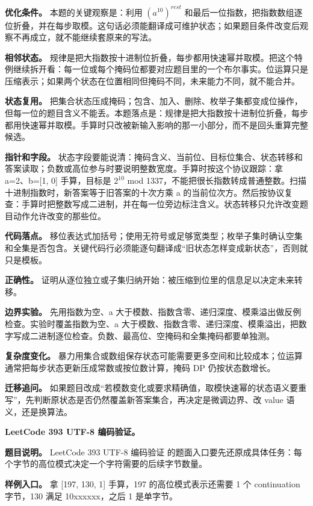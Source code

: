 \textbf{优化条件。} 本题的关键观察是：利用 \ensuremath{(a^10)^{rest}} 和最后一位指数，把指数数组逐位折叠，并在每步取模。这句话必须能翻译成可维护状态；如果题目条件改变后观察不再成立，就不能继续套原来的写法。

\textbf{相邻状态。} 规律是把大指数按十进制位折叠，每步都用快速幂并取模。把这个特例继续拆开看：每一位或每个掩码位都要对应题目里的一个布尔事实。位运算只是压缩表示；如果两个状态在位置相同但掩码不同，未来能力不同，就不能合并。

\textbf{状态复用。} 把集合状态压成掩码；包含、加入、删除、枚举子集都变成位操作，但每一位的题目含义不能丢。本题落点是：规律是把大指数按十进制位折叠，每步都用快速幂并取模。手算时只改被新输入影响的那一小部分，而不是回头重算完整候选。

\textbf{指针和字段。} 状态字段要能说清：掩码含义、当前位、目标位集合、状态转移和答案读取；负数或高位参与时要说明整数宽度。手算时按这个协议跟踪：拿 a=2、b=[1, 0] 手算，目标是 \ensuremath{2^{10}} mod 1337，不能把很长指数转成普通整数。扫描十进制指数时，新答案等于旧答案的十次方乘 a 的当前位次方。然后按协议复查：手算时把整数写成二进制，并在每一位旁边标注含义。状态转移只允许改变题目动作允许改变的那些位。

\textbf{代码落点。} 移位表达式加括号；使用无符号或足够宽类型；枚举子集时确认空集和全集是否包含。关键代码行必须能逐句翻译成“旧状态怎样变成新状态”，否则就只是模板。

\textbf{正确性。} 证明从逐位独立或子集归纳开始：被压缩到位里的信息足以决定未来转移。

\textbf{边界实验。} 先用指数为空、a 大于模数、指数含零、递归深度、模乘溢出做反例检查。实验时覆盖指数为空、a 大于模数、指数含零、递归深度、模乘溢出，把数字写成二进制逐位检查。负数、最高位、空掩码和全集掩码都要单独测。

\textbf{复杂度变化。} 暴力用集合或数组保存状态可能需要更多空间和比较成本；位运算通常把每步状态更新压成常数或按位数计算，掩码 DP 仍按状态数增长。

\textbf{迁移追问。} 如果题目改成“若模数变化或要求精确值，取模快速幂的状态语义要重写”，先判断原状态是否仍然覆盖新答案集合，再决定是微调边界、改 value 语义，还是换算法。

\noindent\textbf{LeetCode 393 UTF-8 编码验证。}

\textbf{题目说明。} LeetCode 393 UTF-8 编码验证 的题面入口要先还原成具体任务：每个字节的高位模式决定一个字符需要的后续字节数量。

\textbf{样例入口。} 拿 [197, 130, 1] 手算，197 的高位模式表示还需要 1 个 continuation 字节，130 满足 10xxxxxx，之后 1 是单字节。

